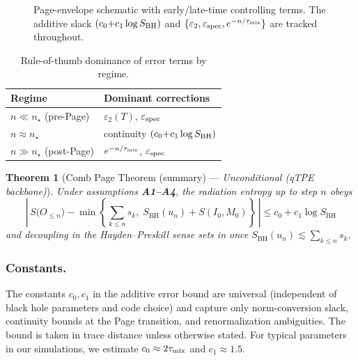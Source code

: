 \documentclass[11pt,a4paper]{article}
\newcommand{\SBH}{\ensuremath{S_{\mathrm{BH}}}}
\theoremstyle{plain}
\newtheorem{theorem}{Theorem}
\theoremstyle{definition}
\theoremstyle{remark}
\begin{document}
\begin{figure}[t]
  \centering
  \vspace{-1ex}
  \caption{Page-envelope schematic with early/late-time controlling terms. The additive
  slack $(c_0{+}c_1\log S_{\rm BH})$ and $\{\varepsilon_2,\varepsilon_{\rm spec},e^{-n/\tau_{\rm mix}}\}$
  are tracked throughout.}
  \label{fig:page-envelope}
\end{figure}

\begin{table}[t]
  \centering
  \small
  \begin{tabular}{l l}
    \hline
    Regime & Dominant corrections \\
    \hline
    $n \ll n_\star$ (pre-Page) & $\varepsilon_2(T)$, $\varepsilon_{\rm spec}$ \\
    $n \approx n_\star$ & continuity $(c_0{+}c_1\log S_{\rm BH})$ \\
    $n \gg n_\star$ (post-Page) & $e^{-n/\tau_{\rm mix}}$, $\varepsilon_{\rm spec}$ \\
    \hline
  \end{tabular}
  \caption{Rule-of-thumb dominance of error terms by regime.}
  \label{tab:error-regimes}
\end{table}

% 

\begin{theorem}[Comb Page Theorem (summary) --- \emph{Unconditional (qTPE backbone)}]
\label{thm:comb-page-summary}
Under assumptions \textbf{A1--A4}, the radiation entropy up to step \(n\) obeys
\begin{equation}
\label{eq:comb_min_principle}
\left|\,S\!\big(O_{\le n}\big)
- \min\!\left\{\sum_{k\le n} s_k,\; S_{\mathrm{BH}}(u_n)+S(I_0,M_0)\right\}\,\right|
\le c_0 + c_1\log \SBH
\end{equation}
and decoupling in the Hayden--Preskill sense sets in once
\(S_{\mathrm{BH}}(u_n) \lesssim \sum_{k\le n} s_k\).
\end{theorem}


\subsubsection{Constants.}
The constants $c_0,c_1$ in the additive error bound are universal (independent of black hole parameters and code choice) and capture
only norm-conversion slack, continuity bounds at the Page transition, and renormalization ambiguities. The bound is taken in trace distance unless otherwise stated.
For typical parameters in our simulations, we estimate $c_0 \approx 2\tau_{\rm mix}$ and $c_1 \approx 1.5$.
\end{document}

